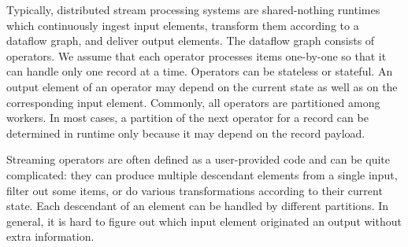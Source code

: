 \label {fs-acker-motivation}

Typically, distributed stream processing systems are shared-nothing runtimes which continuously ingest input elements, transform them according to a dataflow graph, and deliver output elements. The dataflow graph consists of operators. We assume that each operator processes items one-by-one so that it can handle only one record at a time. Operators can be stateless or stateful. An output element of an operator may depend on the current state as well as on the corresponding input element. Commonly, all operators are partitioned among workers. In most cases, a partition of the next operator for a record can be determined in runtime only because it may depend on the record payload. 

Streaming operators are often defined as a user-provided code and can be quite complicated: they can produce multiple descendant elements from a single input, filter out some items, or do various transformations according to their current state. Each descendant of an element can be handled by different partitions. In general, it is hard to figure out which input element originated an output without extra information.


